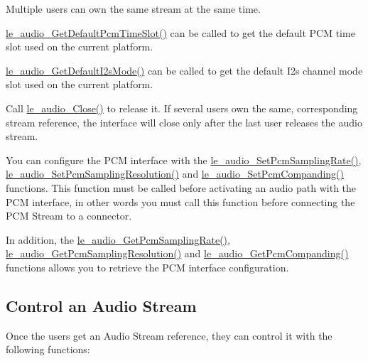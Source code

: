 Multiple users can own the same stream at the same time.

\hyperlink{le__audio__interface_8h_a3f87e41dabde5bfb1170df527c380b9d}{le\+\_\+audio\+\_\+\+Get\+Default\+Pcm\+Time\+Slot()} can be called to get the default P\+C\+M time slot used on the current platform.

\hyperlink{le__audio__interface_8h_a0b727e15c16fffe10cdd5d345b297194}{le\+\_\+audio\+\_\+\+Get\+Default\+I2s\+Mode()} can be called to get the default I2s channel mode slot used on the current platform.

Call \hyperlink{le__audio__interface_8h_abafeb411da7b1a14b2d5777fc1d3e394}{le\+\_\+audio\+\_\+\+Close()} to release it. If several users own the same, corresponding stream reference, the interface will close only after the last user releases the audio stream.

You can configure the P\+C\+M interface with the \hyperlink{le__audio__interface_8h_ae7c9d76c5377ad5fae13b24477827f45}{le\+\_\+audio\+\_\+\+Set\+Pcm\+Sampling\+Rate()}, \hyperlink{le__audio__interface_8h_ab3678e77c8d69f248cd339042bd824cc}{le\+\_\+audio\+\_\+\+Set\+Pcm\+Sampling\+Resolution()} and \hyperlink{le__audio__interface_8h_a593682daa95aec349e48144f5b46c658}{le\+\_\+audio\+\_\+\+Set\+Pcm\+Companding()} functions. This function must be called before activating an audio path with the P\+C\+M interface, in other words you must call this function before connecting the P\+C\+M Stream to a connector.

In addition, the \hyperlink{le__audio__interface_8h_a36779982278d3f965286582f38917247}{le\+\_\+audio\+\_\+\+Get\+Pcm\+Sampling\+Rate()}, \hyperlink{le__audio__interface_8h_a70fbe5e1ae02033e89ad04bbf1ed2b39}{le\+\_\+audio\+\_\+\+Get\+Pcm\+Sampling\+Resolution()} and \hyperlink{le__audio__interface_8h_aab9a28f3c695b90f8b9f622eb401f6cf}{le\+\_\+audio\+\_\+\+Get\+Pcm\+Companding()} functions allows you to retrieve the P\+C\+M interface configuration.\hypertarget{c_audio_le_audio_streams}{}\subsection{Control an Audio Stream}\label{c_audio_le_audio_streams}
Once the users get an Audio Stream reference, they can control it with the following functions\+:


